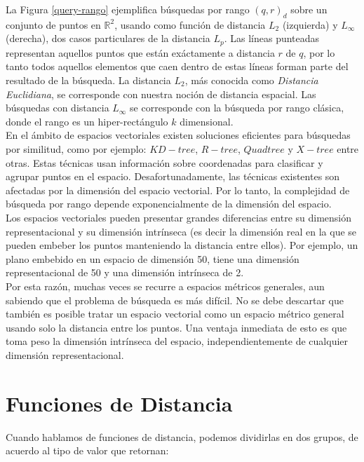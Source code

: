 La Figura \ref{query-rango} ejemplifica b\'usquedas por rango $(q,r)_d$ sobre un conjunto de puntos en $\mathbb R^2$, usando como funci\'on de distancia $L_2$ (izquierda) y $L_{\infty}$ (derecha), dos casos particulares de la distancia $L_p$. Las l\'ineas punteadas representan aquellos puntos que est\'an ex\'actamente a distancia $r$ de $q$, por lo tanto todos aquellos elementos que caen dentro de estas l\'ineas forman parte del resultado de la b\'usqueda. La distancia $L_2$, m\'as conocida como \textit{Distancia Euclidiana}, se corresponde con nuestra noci\'on de distancia espacial. Las b\'usquedas con distancia $L_{\infty}$ se corresponde con la b\'usqueda por rango cl\'asica, donde el rango es un hiper-rect\'angulo $k$ dimensional.\\

En el \'ambito de espacios vectoriales existen soluciones eficientes para b\'usquedas por similitud, como por ejemplo: $KD-tree$, $R-tree$, $Quad tree$ y $X-tree$ entre otras. Estas t\'ecnicas usan informaci\'on sobre coordenadas para clasificar y agrupar puntos en el espacio. Desafortunadamente, las t\'ecnicas existentes son afectadas por la dimensi\'on del espacio vectorial. Por lo tanto, la complejidad de b\'usqueda por rango depende exponencialmente de la dimensi\'on del espacio.\\
 
Los espacios vectoriales pueden presentar grandes diferencias entre su dimensi\'on representacional y su dimensi\'on intr\'inseca (es decir la dimensi\'on real en la que se pueden embeber los puntos manteniendo la distancia entre ellos). Por ejemplo, un plano embebido en un espacio de dimensi\'on 50, tiene una dimensi\'on representacional de 50 y una dimensi\'on intr\'inseca de 2.\\

Por esta raz\'on, muchas veces se recurre a espacios m\'etricos generales, aun sabiendo que el problema de b\'usqueda es m\'as dif\'icil. No se debe descartar que tambi\'en es posible tratar un espacio vectorial como un espacio m\'etrico general usando solo la distancia entre los puntos. Una ventaja inmediata de esto es que toma peso la dimensi\'on intr\'inseca del espacio, independientemente de cualquier dimensi\'on representacional.

\section{Funciones de Distancia}

Cuando hablamos de funciones de distancia, podemos dividirlas en dos grupos, de acuerdo al tipo de valor que retornan:\\

